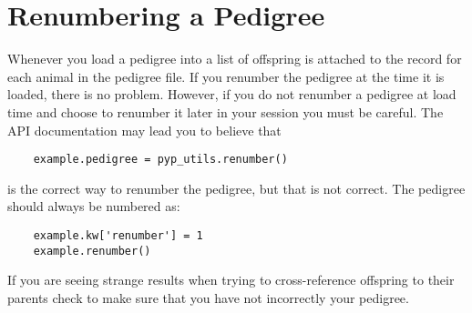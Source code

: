 \section{Renumbering a Pedigree}
\label{sec:renumbering}
Whenever you load a pedigree into \PyPedal{} a list of offspring is attached to the record for each animal in the pedigree file.  If you renumber the pedigree at the time it is loaded, there is no problem.  However, if you do not renumber a pedigree at load time and choose to renumber it later in your session you must be careful.  The API documentation may lead you to believe that
\begin{verbatim}
    example.pedigree = pyp_utils.renumber()
\end{verbatim}
is the correct way to renumber the pedigree, but that is not correct.  The pedigree should always be numbered as:
\begin{verbatim}
    example.kw['renumber'] = 1
    example.renumber()
\end{verbatim}
If you are seeing strange results when trying to cross-reference offspring to their parents check to make sure that you have not incorrectly your pedigree.
